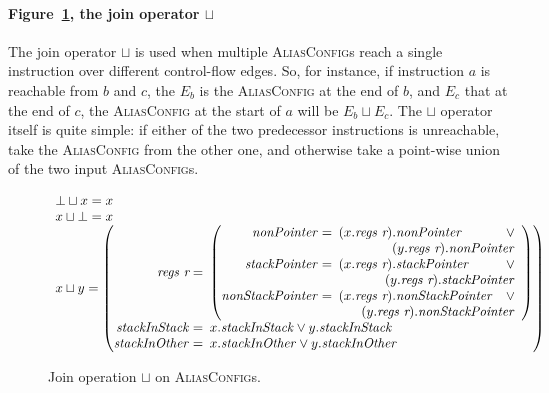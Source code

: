 \paragraph{Figure~\ref{fig:static_alias:join_op}, the join operator $\sqcup$}

The join operator $\sqcup$ is used when multiple
\textsc{AliasConfig}s reach a single instruction over different
control-flow edges.  So, for instance, if instruction $a$ is reachable
from $b$ and $c$, the $E_b$ is the \textsc{AliasConfig} at the end
of $b$, and $E_c$ that at the end of $c$, the \textsc{AliasConfig}
at the start of $a$ will be $E_b \sqcup E_c$.  The $\sqcup$ operator
itself is quite simple: if either of the two predecessor instructions
is unreachable, take the \textsc{AliasConfig} from the other one,
and otherwise take a point-wise union of the two input
\textsc{AliasConfig}s.

\begin{figure}
  \begin{displaymath}
    \begin{array}{l}
    \bot \sqcup x    = x \\
    x    \sqcup \bot = x \\
    x    \sqcup y    = \left(\begin{array}{rl}
      \textit{regs r} = &\!\!\! \left(\begin{array}{rll}
        \mathit{nonPointer} = &\!\!\! (x.\textit{regs r}).\mathit{nonPointer} & \vee \\
                              & \multicolumn{2}{r}{(y.\textit{regs r}).\mathit{nonPointer}} \\
        \mathit{stackPointer} = &\!\!\!(x.\textit{regs r}).\mathit{stackPointer} & \vee \\
                                & \multicolumn{2}{r}{(y.\textit{regs r}).\mathit{stackPointer}} \\
        \!\!\!\mathit{nonStackPointer} = &\!\!\! (x.\textit{regs r}).\mathit{nonStackPointer} & \vee \\
                                   & \multicolumn{2}{r}{(y.\textit{regs r}).\mathit{nonStackPointer}}
        \end{array}\right)\\
      \!\!\!\mathit{stackInStack} = &\!\!\! x.\mathit{stackInStack} \vee y.\mathit{stackInStack} \\
      \!\!\!\mathit{stackInOther} = &\!\!\! x.\mathit{stackInOther} \vee y.\mathit{stackInOther}
    \end{array}\!\!\!\right)
    \end{array}
  \end{displaymath}
  \caption{Join operation $\sqcup$ on \textsc{AliasConfig}s.}
  \label{fig:static_alias:join_op}
\end{figure}

